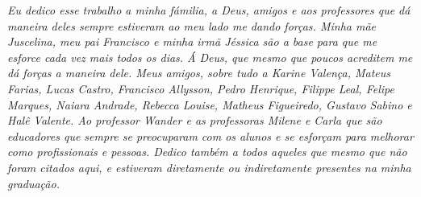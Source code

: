 \begin{dedicatoria}
   \vspace*{\fill}
   \centering
   \noindent
   \textit{Eu dedico esse trabalho a minha fámilia, a Deus, amigos e aos professores que dá maneira deles sempre estiveram ao meu lado me dando forças. Minha mãe Juscelina, meu pai Francisco e minha irmã Jéssica são a base para que me esforce cada vez mais todos os dias. Á Deus, que mesmo que poucos acreditem me dá forças a maneira dele. Meus amigos, sobre tudo a Karine Valença, Mateus Farias, Lucas Castro, Francisco Allysson, Pedro Henrique, Filippe Leal, Felipe Marques, Naiara Andrade, Rebecca Louise, Matheus Figueiredo, Gustavo Sabino e Halê Valente. Ao professor Wander e as professoras Milene e Carla que são educadores que sempre se preocuparam com os alunos e se esforçam para melhorar como profissionais e pessoas. Dedico também a todos aqueles que mesmo que não foram citados aqui, e estiveram diretamente ou indiretamente presentes na minha graduação. }
   \vspace*{\fill}
\end{dedicatoria}
